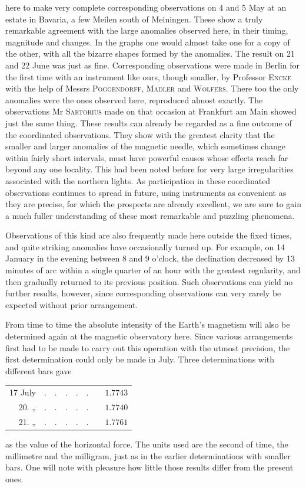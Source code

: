 here to make very complete corresponding observations on 4 and 5 May at an estate in Bavaria, a few Meilen south of Meiningen. These show a truly remarkable agreement with the large anomalies observed here, in their timing, magnitude and changes. In the graphs one would almost take one for a copy of the other, with all the bizarre shapes formed by the anomalies. The result on 21 and 22 June was just as fine. Corresponding observations were made in Berlin for the first time with an instrument like ours, though smaller, by Professor \textsc{Encke} with the help of Messrs \textsc{Poggendorff}, \textsc{Mädler} and \textsc{Wolfers}. There too the only anomalies were the ones observed here, reproduced almost exactly. The observations Mr \textsc{Sartorius} made on that occasion at Frankfurt am Main showed just the same thing. These results can already be regarded as a fine outcome of the coordinated observations. They show with the greatest clarity that the smaller and larger anomalies of the magnetic needle, which sometimes change within fairly short intervals, must have powerful causes whose effects reach far beyond any one locality. This had been noted before for very large irregularities associated with the northern lights. As participation in these coordinated observations continues to spread in future, using instruments as convenient as they are precise, for which the prospects are already excellent, we are sure to gain a much fuller understanding of these most remarkable and puzzling phenomena.

Observations of this kind are also frequently made here outside the fixed times, and quite striking anomalies have occasionally turned up. For example, on 14 January in the evening between 8 and 9 o’clock, the declination decreased by 13 minutes of arc within a single quarter of an hour with the greatest regularity, and then gradually returned to its previous position. Such observations can yield no further results, however, since corresponding observations can very rarely be expected without prior arrangement.

From time to time the absolute intensity of the Earth’s magnetism will also be determined again at the magnetic observatory here. Since various arrangements first had to be made to carry out this operation with the utmost precision, the first determination could only be made
in July. Three determinations with different bars gave
\begin{center}
\begin{tabular}{rllllllr}
17 July & . & . & . & . & . & & $1.7743$\\
20. \enspace „ & . & . & . & . & . & & $1.7740$\\
21. \enspace „ & . & . & . & . & . & & $1.7761$
\end{tabular}
\end{center}
as the value of the horizontal force. The units used are the second of time, the millimetre and the milligram, just as in the earlier determinations with smaller bars. One will note with pleasure how little those results differ from the present ones.

